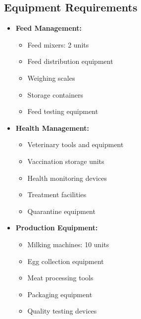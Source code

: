 \subsection{Equipment Requirements}
\begin{itemize}
    \item \textbf{Feed Management:}
    \begin{itemize}
        \item Feed mixers: 2 units
        \item Feed distribution equipment
        \item Weighing scales
        \item Storage containers
        \item Feed testing equipment
    \end{itemize}
    
    \item \textbf{Health Management:}
    \begin{itemize}
        \item Veterinary tools and equipment
        \item Vaccination storage units
        \item Health monitoring devices
        \item Treatment facilities
        \item Quarantine equipment
    \end{itemize}
    
    \item \textbf{Production Equipment:}
    \begin{itemize}
        \item Milking machines: 10 units
        \item Egg collection equipment
        \item Meat processing tools
        \item Packaging equipment
        \item Quality testing devices
    \end{itemize}
\end{itemize}

